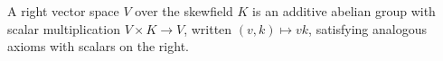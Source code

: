 A right vector space $V$ over the skewfield $K$ is an additive abelian group with scalar multiplication $V \times K \to V$, written $(v, k) \mapsto vk$, satisfying analogous axioms with scalars on the right.
